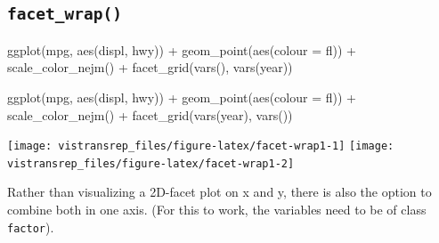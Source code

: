 \documentclass[]{book}
\newenvironment{Shaded}{}{}
\newcommand{\DataTypeTok}[1]{#1}
\newcommand{\KeywordTok}[1]{\textcolor[rgb]{0.00,0.00,1.00}{#1}}
\newcommand{\NormalTok}[1]{#1}
\newcommand{\OperatorTok}[1]{#1}
\newcommand{\StringTok}[1]{\textcolor[rgb]{0.00,0.50,0.50}{#1}}
\begin{document}
\hypertarget{facet_wrap}{%
\subsection{\texorpdfstring{\texttt{facet\_wrap()}}{facet\_wrap()}}\label{facet_wrap}}

\begin{Shaded}
\begin{Highlighting}[]
\KeywordTok{ggplot}\NormalTok{(mpg, }\KeywordTok{aes}\NormalTok{(displ, hwy)) }\OperatorTok{+}
\StringTok{  }\KeywordTok{geom_point}\NormalTok{(}\KeywordTok{aes}\NormalTok{(}\DataTypeTok{colour =}\NormalTok{ fl)) }\OperatorTok{+}
\StringTok{  }\KeywordTok{scale_color_nejm}\NormalTok{() }\OperatorTok{+}
\StringTok{  }\KeywordTok{facet_grid}\NormalTok{(}\KeywordTok{vars}\NormalTok{(), }\KeywordTok{vars}\NormalTok{(year))}

\KeywordTok{ggplot}\NormalTok{(mpg, }\KeywordTok{aes}\NormalTok{(displ, hwy)) }\OperatorTok{+}
\StringTok{  }\KeywordTok{geom_point}\NormalTok{(}\KeywordTok{aes}\NormalTok{(}\DataTypeTok{colour =}\NormalTok{ fl)) }\OperatorTok{+}
\StringTok{  }\KeywordTok{scale_color_nejm}\NormalTok{() }\OperatorTok{+}
\StringTok{  }\KeywordTok{facet_grid}\NormalTok{(}\KeywordTok{vars}\NormalTok{(year), }\KeywordTok{vars}\NormalTok{()) }
\end{Highlighting}
\end{Shaded}

\begin{flushright}\texttt{[image: vistransrep\_files/figure-latex/facet-wrap1-1]} \texttt{[image: vistransrep\_files/figure-latex/facet-wrap1-2]} \end{flushright}

Rather than visualizing a 2D-facet plot on x and y, there is also the option to combine both in one axis.
(For this to work, the variables need to be of class \texttt{factor}).

\begin{Shaded}
\end{Shaded}
\end{document}
